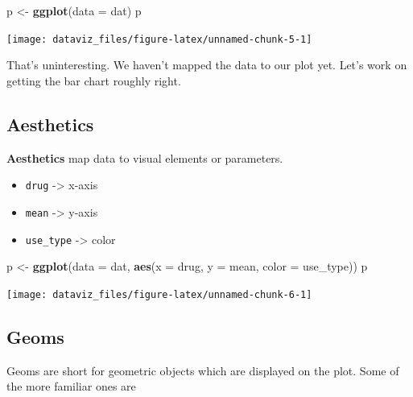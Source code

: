 \documentclass[]{book}
\newenvironment{Shaded}{\begin{snugshade}}{\end{snugshade}}
\newcommand{\DataTypeTok}[1]{\textcolor[rgb]{0.13,0.29,0.53}{#1}}
\newcommand{\KeywordTok}[1]{\textcolor[rgb]{0.13,0.29,0.53}{\textbf{#1}}}
\newcommand{\NormalTok}[1]{#1}
\newcommand{\StringTok}[1]{\textcolor[rgb]{0.31,0.60,0.02}{#1}}
\providecommand{\tightlist}{%
  \setlength{\itemsep}{0pt}\setlength{\parskip}{0pt}}
\theoremstyle{definition}
\theoremstyle{definition}
\theoremstyle{definition}
\theoremstyle{remark}
\begin{document}
\begin{Shaded}
\begin{Highlighting}[]
\NormalTok{p <-}\StringTok{ }\KeywordTok{ggplot}\NormalTok{(}\DataTypeTok{data =}\NormalTok{ dat)}
\NormalTok{p}
\end{Highlighting}
\end{Shaded}

\begin{center}\texttt{[image: dataviz\_files/figure-latex/unnamed-chunk-5-1]} \end{center}

That's uninteresting. We haven't mapped the data to our plot yet. Let's
work on getting the bar chart roughly right.

\hypertarget{aesthetics}{%
\subsection{Aesthetics}\label{aesthetics}}

\textbf{Aesthetics} map data to visual elements or parameters.

\begin{itemize}
\tightlist
\item
  \texttt{drug} -\textgreater{} x-axis
\item
  \texttt{mean} -\textgreater{} y-axis
\item
  \texttt{use\_type} -\textgreater{} color
\end{itemize}

\begin{Shaded}
\begin{Highlighting}[]
\NormalTok{p <-}\StringTok{ }\KeywordTok{ggplot}\NormalTok{(}\DataTypeTok{data =}\NormalTok{ dat, }\KeywordTok{aes}\NormalTok{(}\DataTypeTok{x =}\NormalTok{ drug, }\DataTypeTok{y =}\NormalTok{ mean, }\DataTypeTok{color =}\NormalTok{ use_type)) }
\NormalTok{p}
\end{Highlighting}
\end{Shaded}

\begin{center}\texttt{[image: dataviz\_files/figure-latex/unnamed-chunk-6-1]} \end{center}

\hypertarget{geoms}{%
\subsection{Geoms}\label{geoms}}

Geoms are short for geometric objects which are displayed on the plot.
Some of the more familiar ones are
\end{document}
